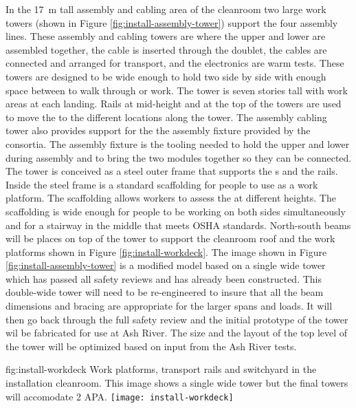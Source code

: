In the \SI{17}{m} tall   assembly and cabling area of the cleanroom two large work towers (shown in Figure \ref{fig:install-assembly-tower}) support the four assembly lines. 
These  assembly and cabling towers are where the upper and lower  are assembled together, the  cable is inserted through the  doublet, the cables are connected and arranged for transport, and the electronics are warm tests. 
These towers are designed to be wide enough to hold two  side by side with enough space between to walk through or work. 
The tower is seven stories tall with work areas at each landing.
Rails at mid-height and at the top of the towers are used to move the  to the different locations along the tower. 
The  assembly cabling tower also provides support for the the  assembly fixture provided by the  consortia. 
The  assembly fixture is the tooling needed to hold the upper and lower  during assembly and to bring the two modules together so they can be connected. 
The  tower is conceived as a steel outer frame that supports the s and the rails. Inside the steel frame is a standard scaffolding for people to use as a work platform. 
The scaffolding allows workers to assess the  at different heights. 
The scaffolding is wide enough for people to be working on both sides simultaneously and for a stairway in the middle that meets OSHA standards. 
North-south beams will be places on top of the tower to support the cleanroom roof and the work platforms shown in Figure \ref{fig:install-workdeck}.
The image shown in Figure \ref{fig:install-assembly-tower} is a modified model based on a single wide  tower which has passed all safety reviews and has already been constructed. 
This double-wide tower will need to be re-engineered to insure that all the beam dimensions and bracing are appropriate for the larger spans and loads. 
It will then go back through the full safety review and the initial prototype of the tower wil be fabricated for use at Ash River. 
The size and the layout of the top level of the tower will be optimized based on input from the Ash River tests. 


\begin{dunefigure}{fig:install-workdeck}
  {Work platforms, transport rails and switchyard in the installation cleanroom. This image shows a single wide tower but the final towers will accomodate 2 APA.}
\texttt{[image: install-workdeck]}
\end{dunefigure}

